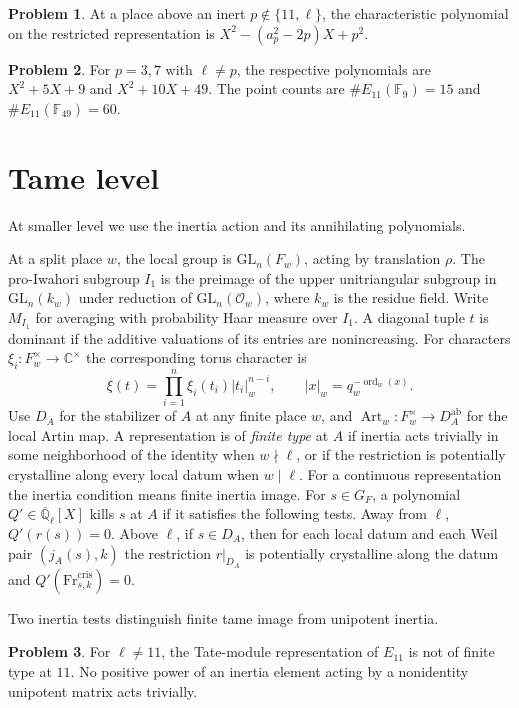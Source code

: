 \documentclass[reqno]{amsart}
\theoremstyle{definition}
\newtheorem{problem}{Problem}[section]
\newcommand{\Q}{\mathbb Q}
\newcommand{\F}{\mathbb F}
\newcommand{\C}{\mathbb C}
\newcommand{\Qlbar}{\overline{\Q}_\ell}
\newcommand{\GL}{\mathrm{GL}}
\newcommand{\Fr}{\mathrm{Fr}}
\newcommand{\ord}{\operatorname{ord}}
\newcommand{\rec}{\operatorname{Art}}
\begin{document}
\begin{problem}\label{pr:square-frob}
At a place above an inert \(p\notin\{11,\ell\}\), the characteristic polynomial on the restricted representation is \(X^2-(a_p^2-2p)X+p^2\).
\end{problem}

\begin{problem}\label{pr:inert-base}
For \(p=3,7\) with \(\ell\ne p\), the respective polynomials are \(X^2+5X+9\) and \(X^2+10X+49\).  The point counts are \(\#E_{11}(\F_9)=15\) and \(\#E_{11}(\F_{49})=60\).
\end{problem}

\section{Tame level}\label{sec:tame}

At smaller level we use the inertia action and its annihilating polynomials.

At a split place \(w\), the local group is \(\GL_n(F_w)\), acting by translation \(\rho\).  The pro-Iwahori subgroup \(I_1\) is the preimage of the upper unitriangular subgroup in \(\GL_n(k_w)\) under reduction of \(\GL_n(\mathcal O_w)\), where \(k_w\) is the residue field.  Write \(M_{I_1}\) for averaging with probability Haar measure over \(I_1\).  A diagonal tuple \(t\) is dominant if the additive valuations of its entries are nonincreasing.  For characters \(\xi_i:F_w^\times\to\C^\times\) the corresponding torus character is
\[
 \xi(t)=\prod_{i=1}^n\xi_i(t_i)|t_i|_w^{n-i},
 \qquad |x|_w=q_w^{-\ord_w(x)} .
\]
Use \(D_A\) for the stabilizer of \(A\) at any finite place \(w\), and \(\rec_w:F_w^\times\to D_A^{\mathrm{ab}}\) for the local Artin map.  A representation is of \emph{finite type} at \(A\) if inertia acts trivially in some neighborhood of the identity when \(w\nmid\ell\), or if the restriction is potentially crystalline along every local datum when \(w\mid\ell\).  For a continuous representation the inertia condition means finite inertia image.  For \(s\in G_F\), a polynomial \(Q'\in\Qlbar[X]\) kills \(s\) at \(A\) if it satisfies the following tests.  Away from \(\ell\), \(Q'(r(s))=0\).  Above \(\ell\), if \(s\in D_A\), then for each local datum and each Weil pair \((j_A(s),k)\) the restriction \(r|_{D_A}\) is potentially crystalline along the datum and \(Q'(\Fr^{\mathrm{cris}}_{s,k})=0\).

Two inertia tests distinguish finite tame image from unipotent inertia.

\begin{problem}\label{pr:tate}
For \(\ell\ne11\), the Tate-module representation of \(E_{11}\) is not of finite type at \(11\).  No positive power of an inertia element acting by a nonidentity unipotent matrix acts trivially.
\end{problem}
\end{document}
